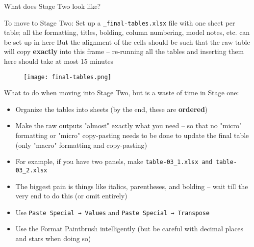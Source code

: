 \documentclass[aspectratio=169]{beamer}
\begin{document}
\begin{frame}[fragile]{What does Stage Two look like?}
\begin{multicols}{2}
     To move to Stage Two:
    \newline \newline
    Set up a \texttt{\_final-tables.xlsx} file with one sheet per table; all the formatting, titles, bolding, column numbering, model notes, etc. can be set up in here
    \newline \newline
    But the alignment of the cells should be such that the raw table will copy \textbf{exactly} into this frame -- re-running all the tables and inserting them here should take at most 15 minutes
\begin{figure}
    \centering
    \texttt{[image: final-tables.png]}
\end{figure}
\end{multicols}
\end{frame}

\begin{frame}
What to do when moving into Stage Two, but is a waste of time in Stage one:
\begin{itemize}
    \item Organize the tables into sheets (by the end, these are \textbf{ordered})
    \item Make the raw outputs "almost" exactly what you need -- so that no "micro" formatting or "micro" copy-pasting needs to be done to update the final table (only "macro" formatting and copy-pasting)
    \item For example, if you have two panels, make \texttt{table-03\_1.xlsx and table-03\_2.xlsx}
    \item The biggest pain is things like italics, parentheses, and bolding -- wait till the very end to do this (or omit entirely)
    \item Use \texttt{Paste Special → Values} and \texttt{Paste Special → Transpose}
    \item Use the Format Paintbrush intelligently (but be careful with decimal places and stars when doing so)
\end{itemize}
\end{frame}

\end{document}
